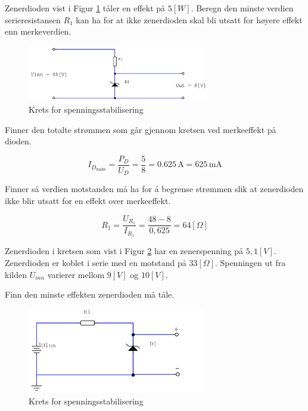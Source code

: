 \begin{question}[name=Oppgave, topic=zenerdioder]
Zenerdioden vist i Figur \ref{fig:zenKrets3} tåler en effekt på $5 [W]$. Beregn den minste verdien serieresistansen $R_1$ kan ha for at ikke zenerdioden skal bli utsatt for høyere effekt enn merkeverdien.
\begin{figure}[H]
	\centering
	\includegraphics[width=0.7\textwidth]{diode/figurer/zenKrets3.png}
	\caption{Krets for spenningsstabilisering}
	\label{fig:zenKrets3}
\end{figure}	
\end{question}

\vspace{0.5cm} %

\begin{solution}[name=Løsningsforslag oppgave]
Finner den totalte strømmen som går gjennom kretsen ved merkeeffekt på dioden.

\[I_{D_{\text{maks}}} = \frac{P_D}{U_D} = \frac{5}{8} = 0.625 \, \text{A} = 625 \, \text{mA}\]


Finner så verdien motstanden må ha for å begrense strømmen slik at zenerdioden ikke blir utsatt for en effekt over merkeeffekt.


\[R_1 = \frac{U_{R_1}}{I_{R_1}}= \frac{48-8}{0,625}= 64 [\Omega]\]
\end{solution}



\begin{question}[name=Oppgave, topic=zenerdioder]
Zenerdioden i kretsen som vist i Figur \ref{fig:zenKrets4} har en zenerspenning på $5,1 [V]$. Zenerdioden er koblet i serie med en motstand på $33 [\Omega]$. Spenningen ut fra kilden $U_{inn}$ varierer mellom $9[V]$ og $10 [V]$.

Finn den minste effekten zenerdioden må tåle.
\begin{figure}[H]
	\centering
	\includegraphics[width=0.7\textwidth]{diode/figurer/zenKrets4.png}
	\caption{Krets for spenningsstabilisering}
	\label{fig:zenKrets4}
\end{figure}	

\end{question}

